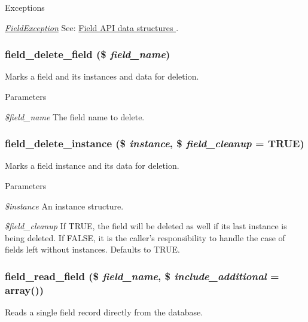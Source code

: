 \begin{DoxyExceptions}{Exceptions}
\item[{\em \hyperlink{classFieldException}{FieldException}}]See: \hyperlink{group__field}{Field API data structures }. \end{DoxyExceptions}
\hypertarget{group__field__crud_gaa4792fd8f5f651b985dec7eca250f0f1}{
\subsubsection[{field\_\-delete\_\-field}]{\setlength{\rightskip}{0pt plus 5cm}field\_\-delete\_\-field (\$ {\em field\_\-name})}}
\label{group__field__crud_gaa4792fd8f5f651b985dec7eca250f0f1}
Marks a field and its instances and data for deletion.


\begin{DoxyParams}{Parameters}
\item[{\em \$field\_\-name}]The field name to delete. \end{DoxyParams}
\hypertarget{group__field__crud_ga16bf0e2a15b20b066ff84403b5f24bf5}{
\subsubsection[{field\_\-delete\_\-instance}]{\setlength{\rightskip}{0pt plus 5cm}field\_\-delete\_\-instance (\$ {\em instance}, \/  \$ {\em field\_\-cleanup} = {\ttfamily TRUE})}}
\label{group__field__crud_ga16bf0e2a15b20b066ff84403b5f24bf5}
Marks a field instance and its data for deletion.


\begin{DoxyParams}{Parameters}
\item[{\em \$instance}]An instance structure. \item[{\em \$field\_\-cleanup}]If TRUE, the field will be deleted as well if its last instance is being deleted. If FALSE, it is the caller's responsibility to handle the case of fields left without instances. Defaults to TRUE. \end{DoxyParams}
\hypertarget{group__field__crud_ga65901c0b18f1d074852b3fb0ba93cabb}{
\subsubsection[{field\_\-read\_\-field}]{\setlength{\rightskip}{0pt plus 5cm}field\_\-read\_\-field (\$ {\em field\_\-name}, \/  \$ {\em include\_\-additional} = {\ttfamily array()})}}
\label{group__field__crud_ga65901c0b18f1d074852b3fb0ba93cabb}
Reads a single field record directly from the database.

